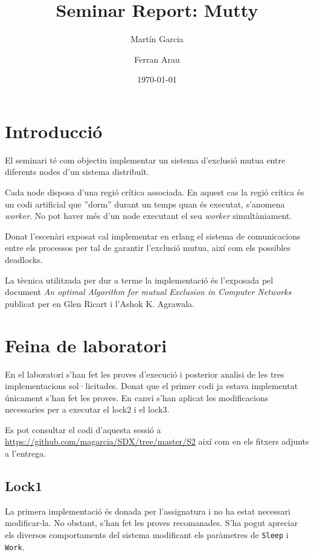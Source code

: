 \documentclass[a4paper, 11pt]{article}
\title{Seminar Report: Mutty}
\author{Martín Garcia \and Ferran Arau}
\date{\today{}}
\begin{document}
\maketitle

\section{Introducció}


El seminari té com objectiu implementar un sistema d'exclusió mutua entre
diferents nodes d'un sistema distribuït. 

Cada node disposa d'una regió crítica associada. En aquest cas la regió crítica
és un codi artificial que ''dorm'' durant un temps quan és executat, s'anomena
\textit{worker}. No pot haver més d'un node executant el seu \textit{worker}
simultàniament. 

Donat l'escenàri exposat cal implementar en erlang el sistema de comunicacions
entre els processos per tal de garantir l'exclusió mutua, així com els possibles
deadlocks. 

La tècnica utilitzada per dur a terme la implementació és l'exposada pel
document \textit{An optimal Algorithm for mutual Exclusion in Computer Networks}
publicat per en Glen Ricart i l’Ashok K. Agrawala.

\section{Feina de laboratori}

En el laboratori s'han fet les proves d'execució i posterior analisi de les tres implementacions sol·licitades. 
Donat que el primer codi ja estava implementat únicament s'han fet les proves. En canvi s'han aplicat les modificacions necessaries per a executar el lock2 i el lock3. 

Es pot consultar el codi d'aquesta sessió a \url{https://github.com/magarcia/SDX/tree/master/S2} així com en els fitxers adjunts a l'entrega.

\subsection{Lock1}

La primera implementació és donada per l'assignatura i no ha estat necessari
modificar-la. No obstant, s'han fet les proves recomanades. S'ha pogut apreciar
els diversos comportaments del sistema modificant els paràmetres de
\texttt{Sleep} i \texttt{Work}.
\end{document}
